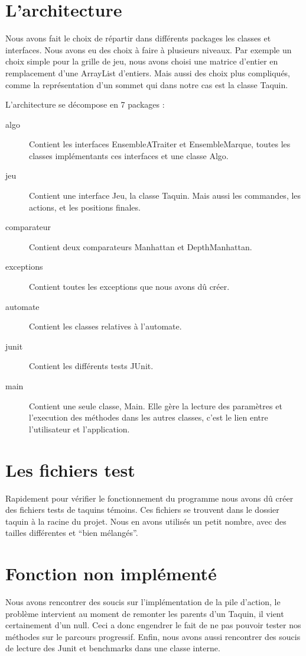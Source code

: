 ﻿\documentclass[a4paper,twoside,12pt]{report}
\begin{document}
\section{L'architecture}
\par
Nous avons fait le choix de répartir dans différents packages les classes et 
interfaces. Nous avons eu des choix à faire à plusieurs niveaux. Par
exemple un choix simple pour la grille de jeu, nous avons choisi une matrice 
d'entier en remplacement d'une ArrayList d'entiers. Mais aussi des choix plus
compliqués, comme la représentation d'un sommet qui dans notre cas est la classe 
Taquin.
\par\noindent
L'architecture se décompose en 7 packages : 
\begin{description}
 \item [algo] Contient les interfaces EnsembleATraiter et EnsembleMarque, toutes 
les classes implémentants ces interfaces et une classe Algo.
 \item [jeu] Contient une interface Jeu, la classe Taquin. Mais aussi les 
commandes, les actions, et les positions finales.
 \item [comparateur] Contient deux comparateurs Manhattan et DepthManhattan.
 \item [exceptions] Contient toutes les exceptions que nous avons dû créer.
 \item [automate] Contient les classes relatives à l'automate.
 \item [junit] Contient les différents tests JUnit.
 \item [main] Contient une seule classe, Main. Elle gère la lecture des 
paramètres et l'execution des méthodes dans les autres classes, c'est
 le lien entre l'utilisateur et l'application.
\end{description}

\section{Les fichiers test}
\par
Rapidement pour vérifier le fonctionnement du programme nous avons dû créer des fichiers tests de taquins témoins. Ces fichiers se trouvent dans le dossier taquin
à la racine du projet. Nous en avons utilisés un petit nombre, avec des tailles différentes et ``bien mélangés''.
%
\section{Fonction non implémenté}
Nous avons rencontrer des soucis sur l'implémentation de la pile d'action, le problème intervient au moment de remonter les parents d'un Taquin, il vient
certainement d'un null. Ceci a donc engendrer le fait de ne pas pouvoir tester nos méthodes sur le parcours progressif.
Enfin, nous avons aussi rencontrer des soucis de lecture des Junit et benchmarks dans une classe interne.
\end{document}
